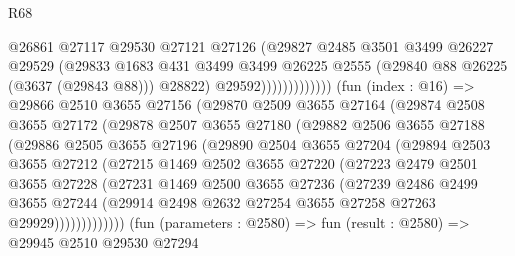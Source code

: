 \begin{lexlean}{R68}
\begin{coremodule}
                                @26861
                                @27117
                                @29530
                                @27121
                                @27126
                                (@29827
                                  @2485
                                  @3501
                                  @3499
                                  @26227
                                  @29529
                                  (@29833
                                    @1683
                                    @431
                                    @3499
                                    @3499
                                    @26225
                                    @2555
                                    (@29840 @88 @26225 (@3637 (@29843 @88)))
                                    @28822)
                                  @29592)))))))))))))
        (fun (index : @16) =>
        @29866
          @2510
          @3655
          @27156
          (@29870
            @2509
            @3655
            @27164
            (@29874
              @2508
              @3655
              @27172
              (@29878
                @2507
                @3655
                @27180
                (@29882
                  @2506
                  @3655
                  @27188
                  (@29886
                    @2505
                    @3655
                    @27196
                    (@29890
                      @2504
                      @3655
                      @27204
                      (@29894
                        @2503
                        @3655
                        @27212
                        (@27215
                          @1469
                          @2502
                          @3655
                          @27220
                          (@27223
                            @2479
                            @2501
                            @3655
                            @27228
                            (@27231
                              @1469
                              @2500
                              @3655
                              @27236
                              (@27239
                                @2486
                                @2499
                                @3655
                                @27244
                                (@29914 @2498 @2632 @27254 @3655 @27258 @27263 @29929)))))))))))))
        (fun (parameters : @2580) =>
        fun (result : @2580) =>
        @29945
          @2510
          @29530
          @27294

\end{coremodule}
\end{lexlean}
